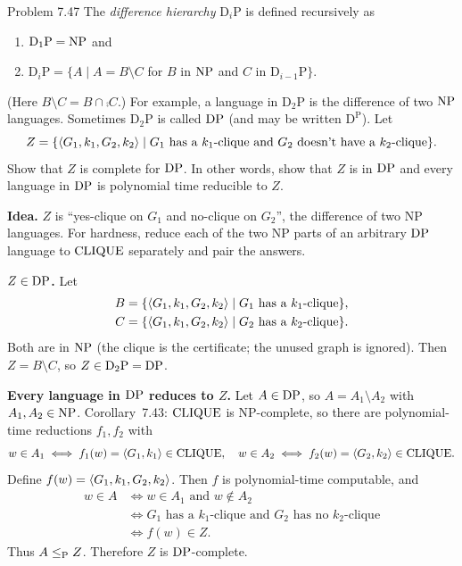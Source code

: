 \begin{question}{Problem 7.47}
The \emph{difference hierarchy} $\mathrm{D}_i\mathrm{P}$ is defined recursively as
\begin{enumerate}[label=\alph*.]
\item $\mathrm{D}_1\mathrm{P}=\mathrm{NP}$ and
\item $\mathrm{D}_i\mathrm{P}=\{A\mid A=B\setminus C$ for $B$ in $\mathrm{NP}$ and $C$ in $\mathrm{D}_{i-1}\mathrm{P}\}$.
\end{enumerate}
(Here $B\setminus C=B\cap\comp{C}$.)
For example, a language in $\mathrm{D}_2\mathrm{P}$ is the difference of two $\mathrm{NP}$ languages. Sometimes $\mathrm{D}_2\mathrm{P}$ is called $\mathrm{DP}$ (and may be written $\mathrm{D}^{\mathrm{P}}$). Let
\[
Z=\{\langle G_1,k_1,G_2,k_2\rangle\mid G_1\text{ has a $k_1$-clique and $G_2$ doesn't have a $k_2$-clique}\}.
\]
Show that $Z$ is complete for $\mathrm{DP}$. In other words, show that $Z$ is in $\mathrm{DP}$ and every language in $\mathrm{DP}$ is polynomial time reducible to $Z$.
\end{question}
\begin{soln}
\textbf{Idea.} $Z$ is ``yes-clique on $G_1$ and no-clique on $G_2$'', the difference of two NP languages. For hardness, reduce each of the two NP parts of an arbitrary $\mathrm{DP}$ language to $\mathrm{CLIQUE}$ separately and pair the answers.

\textbf{$Z\in\mathrm{DP}$.}
Let
\begin{align*}
B&=\{\langle G_1,k_1,G_2,k_2\rangle\mid G_1\text{ has a $k_1$-clique}\},\\
C&=\{\langle G_1,k_1,G_2,k_2\rangle\mid G_2\text{ has a $k_2$-clique}\}.
\end{align*}
Both are in $\mathrm{NP}$ (the clique is the certificate; the unused graph is ignored). Then $Z=B\setminus C$, so $Z\in\mathrm{D}_2\mathrm{P}=\mathrm{DP}$.

\textbf{Every language in $\mathrm{DP}$ reduces to $Z$.}
Let $A\in\mathrm{DP}$, so $A=A_1\setminus A_2$ with $A_1,A_2\in\mathrm{NP}$. Corollary~7.43: $\mathrm{CLIQUE}$ is NP-complete, so there are polynomial-time reductions $f_1,f_2$ with
\[
w\in A_1\iff f_1(w)=\langle G_1,k_1\rangle\in\mathrm{CLIQUE},
\quad
w\in A_2\iff f_2(w)=\langle G_2,k_2\rangle\in\mathrm{CLIQUE}.
\]
Define $f(w)=\langle G_1,k_1,G_2,k_2\rangle$. Then $f$ is polynomial-time computable, and
\begin{align*}
w\in A
&\iff w\in A_1\text{ and }w\notin A_2\\
&\iff G_1\text{ has a $k_1$-clique and }G_2\text{ has no $k_2$-clique}\\
&\iff f(w)\in Z.
\end{align*}
Thus $A\le_{\mathrm{P}} Z$. Therefore $Z$ is $\mathrm{DP}$-complete.
\end{soln}

